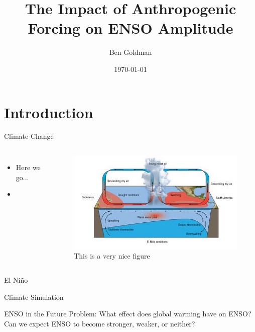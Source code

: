 \documentclass{beamer}
\title{The Impact of Anthropogenic Forcing on ENSO Amplitude}
\author{Ben Goldman}
\date{\today}
\begin{document}
\maketitle

\section{Introduction}

\begin{frame}{Climate Change}

  \begin{columns}
    \begin{itemize}
    \item Here we go...
    \item \cite{bjerknes1969atmospheric}
    \end{itemize}
    \begin{figure}
      \centering
      \includegraphics[width=\textwidth]{figures/example.jpg}
      \caption{This is a very nice figure}
      \label{fig:this}
    \end{figure}
  \end{columns}
\end{frame}

\begin{frame}{El Niño}

\end{frame}

\begin{frame}{Climate Simulation}

\end{frame}

\begin{frame}{ENSO in the Future}
  Problem: What effect does global warming have on ENSO? Can we expect ENSO to become stronger, weaker, or neither?
\end{frame}
\end{document}
